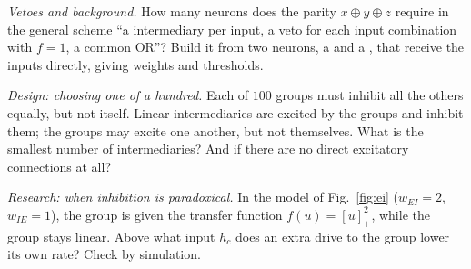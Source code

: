 \begin{exercise}[\lvlB]
\label{ex:03:6}
\emph{Vetoes and background.} How many neurons does the parity $x\oplus y\oplus z$ require in the general scheme ``a  intermediary per input, a veto for each input combination with $f=1$, a common OR''? Build it from two neurons, a  and a , that receive the inputs directly, giving weights and thresholds.
\end{exercise}

\begin{exercise}[\lvlC]
\label{ex:03:7}
\emph{Design: choosing one of a hundred.} Each of $100$  groups must inhibit all the others equally, but not itself. Linear  intermediaries are excited by the groups and inhibit them; the groups may excite one another, but not themselves. What is the smallest number of intermediaries? And if there are no direct excitatory connections at all?
\end{exercise}

\begin{exercise}[\lvlC]
\label{ex:03:8}
\emph{Research: when inhibition is paradoxical.} In the model of Fig.~\ref{fig:ei} ($w_{EI}=2$, $w_{IE}=1$), the  group is given the transfer function $f(u)=[u]_+^2$, while the  group stays linear. Above what input $h_c$ does an extra drive to the  group lower its own rate? Check by simulation.
\end{exercise}
